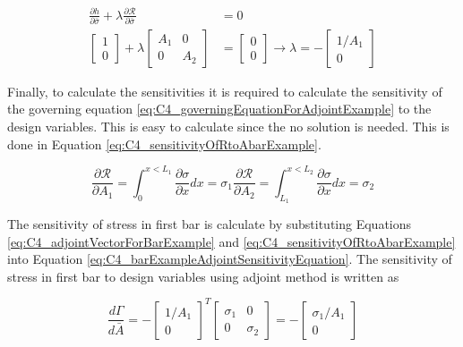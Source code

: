 \begin{align}\label{eq:C4_adjointVectorForBarExample}
	\frac{\partial h}{\partial \bar{\sigma}} + \lambda \frac{\partial \mathcal{R}}{\partial \bar{\sigma}} &= 0 \nonumber \\
	\begin{bmatrix}
	1 \\
	0
	\end{bmatrix} + 
	\lambda
	\begin{bmatrix}
	A_1 & 0 \\
	0 & A_2
	\end{bmatrix}
	&=
	\begin{bmatrix}
	0 \\
	0
	\end{bmatrix} \rightarrow
	\lambda = -
	\begin{bmatrix}
	1/A_1 \\
	0
	\end{bmatrix}
\end{align}

Finally, to calculate the sensitivities it is required to calculate the sensitivity of the governing equation \eqref{eq:C4_governingEquationForAdjointExample} to the design variables. This is easy to calculate since the no solution is needed. This is done in Equation \eqref{eq:C4_sensitivityOfRtoAbarExample}.

\begin{subequations}\label{eq:C4_sensitivityOfRtoAbarExample}
\begin{equation}
	\frac{\partial \mathcal{R}}{\partial A_1} = \int_0^{x < L_1} \frac{\partial \sigma}{\partial x} dx = \sigma_1
\end{equation}
\begin{equation}
	\frac{\partial \mathcal{R}}{\partial A_2} = \int_{L_1}^{x < L_2} \frac{\partial \sigma}{\partial x} dx = \sigma_2
\end{equation}
\end{subequations}

The sensitivity of stress in first bar is calculate by substituting Equations \eqref{eq:C4_adjointVectorForBarExample} and \eqref{eq:C4_sensitivityOfRtoAbarExample} into Equation \eqref{eq:C4_barExampleAdjointSensitivityEquation}. The sensitivity of stress in first bar to design variables using adjoint method is written as

\begin{equation}
	\frac{d \Gamma}{d \bar{A}} = 
	-\begin{bmatrix}
	1/A_1 \\
	0
	\end{bmatrix}^T
	\begin{bmatrix}
	\sigma_1 & 0 \\
	0 & \sigma_2
	\end{bmatrix} =
	-
	\begin{bmatrix}
	\sigma_1 / A_1 \\
	0
	\end{bmatrix}
\end{equation}

